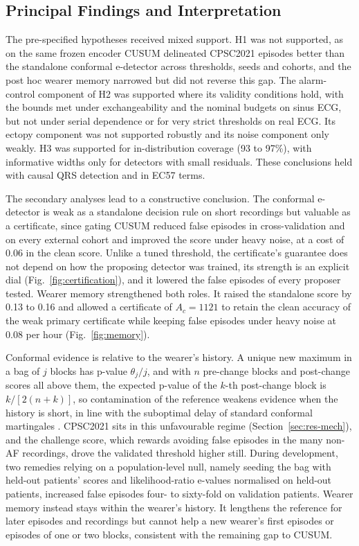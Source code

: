 \documentclass[preprint,12pt]{elsarticle}
\newcommand{\1}{\mathbf{1}}
\begin{document}
\subsection{Principal Findings and Interpretation}
The pre-specified hypotheses received mixed support. H1 was not supported, as on the same frozen encoder CUSUM delineated CPSC2021 episodes better than the standalone conformal e-detector across thresholds, seeds and cohorts, and the post hoc wearer memory narrowed but did not reverse this gap. The alarm-control component of H2 was supported where its validity conditions hold, with the bounds met under exchangeability and the nominal budgets on sinus ECG, but not under serial dependence or for very strict thresholds on real ECG. Its ectopy component was not supported robustly and its noise component only weakly. H3 was supported for in-distribution coverage (93 to 97\%), with informative widths only for detectors with small residuals. These conclusions held with causal QRS detection and in EC57 terms.

The secondary analyses lead to a constructive conclusion. The conformal e-detector is weak as a standalone decision rule on short recordings but valuable as a certificate, since gating CUSUM reduced false episodes in cross-validation and on every external cohort and improved the score under heavy noise, at a cost of 0.06 in the clean score. Unlike a tuned threshold, the certificate's guarantee does not depend on how the proposing detector was trained, its strength is an explicit dial (Fig.~\ref{fig:certification}), and it lowered the false episodes of every proposer tested. Wearer memory strengthened both roles. It raised the standalone score by 0.13 to 0.16 and allowed a certificate of $A_c=1121$ to retain the clean accuracy of the weak primary certificate while keeping false episodes under heavy noise at 0.08 per hour (Fig.~\ref{fig:memory}).

Conformal evidence is relative to the wearer's history. A unique new maximum in a bag of $j$ blocks has p-value $\theta_j/j$, and with $n$ pre-change blocks and post-change scores all above them, the expected p-value of the $k$-th post-change block is $k/[2(n+k)]$, so contamination of the reference weakens evidence when the history is short, in line with the suboptimal delay of standard conformal martingales \cite{bhattacharyya2026conformal}. CPSC2021 sits in this unfavourable regime (Section~\ref{sec:res-mech}), and the challenge score, which rewards avoiding false episodes in the many non-AF recordings, drove the validated threshold higher still. During development, two remedies relying on a population-level null, namely seeding the bag with held-out patients' scores and likelihood-ratio e-values normalised on held-out patients, increased false episodes four- to sixty-fold on validation patients. Wearer memory instead stays within the wearer's history. It lengthens the reference for later episodes and recordings but cannot help a new wearer's first episodes or episodes of one or two blocks, consistent with the remaining gap to CUSUM.
\end{document}
